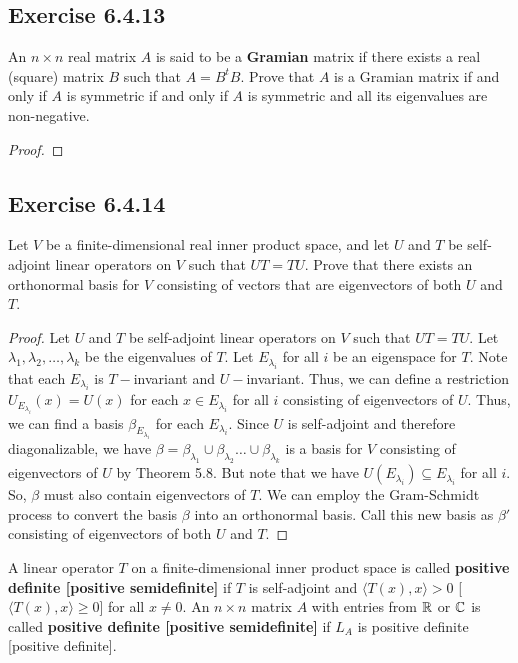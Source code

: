 \subsection*{Exercise 6.4.13} An \( n \times n  \) real matrix \( A  \) is said to be a \textbf{Gramian} matrix if there exists a real (square) matrix \( B  \) such that \( A = B^{t} B  \). Prove that \( A  \) is a Gramian matrix if and only if \( A  \) is symmetric if and only if \( A  \) is symmetric and all its eigenvalues are non-negative. 
\begin{proof}

\end{proof}

\subsection*{Exercise 6.4.14} Let \( V  \) be a finite-dimensional real inner product space, and let \( U \) and \( T  \) be self-adjoint linear operators on \( V  \) such that \( UT = TU  \). Prove that there exists an orthonormal basis for \( V  \) consisting of vectors that are eigenvectors of both \( U  \) and \( T  \).
\begin{proof}
Let \( U  \) and \( T  \) be self-adjoint linear operators on \( V  \) such that \( UT = TU  \). Let \( {\lambda}_{1}, {\lambda}_{2}, \dots, {\lambda}_{k} \) be the eigenvalues of \( T \). Let \( {E}_{{\lambda}_{i}} \) for all \( i \) be an eigenspace for \( T \). Note that each \( {E}_{{\lambda}_{i}} \) is \( T- \)invariant and \( U- \)invariant. Thus, we can define a restriction \( {U}_{{E}_{{\lambda}_{i}}}(x) = U(x)  \) for each \( x \in {E}_{{\lambda}_{i}} \) for all \( i  \) consisting of eigenvectors of \( U \). Thus, we can find a basis \( {\beta}_{{E}_{{\lambda}_{i}}} \) for each \( {E}_{{\lambda}_{i}} \). Since \( U \) is self-adjoint and therefore diagonalizable, we have \( \beta = {\beta}_{{\lambda}_{1}} \cup {\beta}_{{\lambda}_{2}} \dots \cup {\beta}_{{\lambda}_{k}}    \) is a basis for \( V  \) consisting of eigenvectors of \( U  \) by Theorem 5.8. But note that we have \( U({E}_{{\lambda}_{i}}) \subseteq {E}_{{\lambda}_{i}}  \) for all \( i \). So, \( \beta \) must also contain eigenvectors of \( T \). We can employ the Gram-Schmidt process to convert the basis \( \beta \) into an orthonormal basis. Call this new basis as \( \beta'  \) consisting of eigenvectors of both \( U  \) and \( T \).
\end{proof}

\begin{definition}
    A linear operator \( T  \) on a finite-dimensional inner product space is called \textbf{positive definite [positive semidefinite]} if \( T  \) is self-adjoint and \( \langle T(x) , x \rangle > 0  \) [\( \langle T(x) , x \rangle \geq 0  \)] for all \( x \neq 0  \). 
    An \( n \times n  \) matrix \( A  \) with entries from \( \mathbb{R}  \) or \( \mathbb{C}  \) is called \textbf{positive definite [positive semidefinite]} if \( {L}_{A} \) is positive definite [positive definite].
\end{definition}

